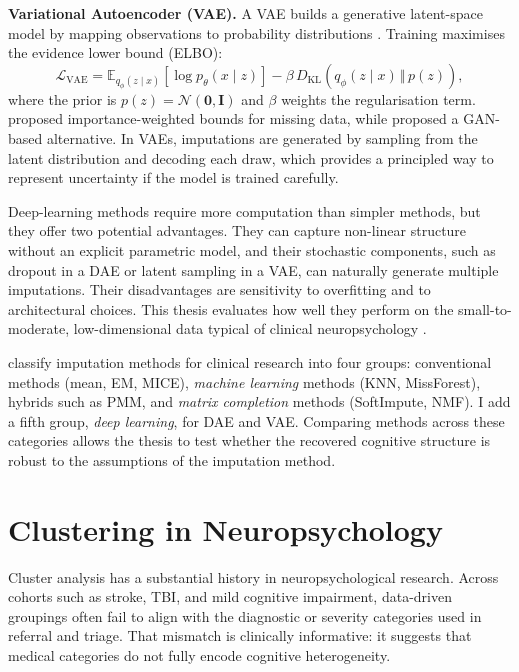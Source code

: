 \textbf{Variational Autoencoder (VAE).} A VAE builds a generative latent-space model by mapping observations to probability distributions \parencite{kingma2014auto, mccoy2018variational}. Training maximises the evidence lower bound (ELBO):
\begin{equation}\label{eq:vae}
\mathcal{L}_{\mathrm{VAE}}=\mathbb{E}_{q_\phi(z\mid x)}\!\left[\log p_\theta(x\mid z)\right]-\beta\,D_{\mathrm{KL}}\!\left(q_\phi(z\mid x)\,\big\Vert\,p(z)\right),
\end{equation}
where the prior is $p(z)=\mathcal{N}(\mathbf{0},\mathbf{I})$ and $\beta$ weights the regularisation term. \textcite{mattei2019miwae} proposed importance-weighted bounds for missing data, while \textcite{yoon2018gain} proposed a GAN-based alternative. In VAEs, imputations are generated by sampling from the latent distribution and decoding each draw, which provides a principled way to represent uncertainty if the model is trained carefully.

Deep-learning methods require more computation than simpler methods, but they offer two potential advantages. They can capture non-linear structure without an explicit parametric model, and their stochastic components, such as dropout in a DAE or latent sampling in a VAE, can naturally generate multiple imputations. Their disadvantages are sensitivity to overfitting and to architectural choices. This thesis evaluates how well they perform on the small-to-moderate, low-dimensional data typical of clinical neuropsychology \parencite{prakash2024benchmarking}.

\textcite{afkanpour2024identify} classify imputation methods for clinical research into four groups: conventional methods (mean, EM, MICE), \textit{machine learning} methods (KNN, MissForest), hybrids such as PMM, and \textit{matrix completion} methods (SoftImpute, NMF). I add a fifth group, \textit{deep learning}, for DAE and VAE. Comparing methods across these categories allows the thesis to test whether the recovered cognitive structure is robust to the assumptions of the imputation method.


\section{Clustering in Neuropsychology}

Cluster analysis has a substantial history in neuropsychological research. Across cohorts such as stroke, TBI, and mild cognitive impairment, data-driven groupings often fail to align with the diagnostic or severity categories used in referral and triage. That mismatch is clinically informative: it suggests that medical categories do not fully encode cognitive heterogeneity.

